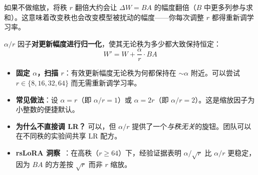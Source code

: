 \begin{intuitionbox}
如果不做缩放，将秩 $r$ 翻倍大约会让 $\Delta W = BA$ 的幅度翻倍（$B$ 中更多列参与求和）。这意味着改变秩也会改变模型被扰动的幅度——你每次调整 $r$ 都得重新调学习率。

$\alpha/r$ 因子\textbf{对更新幅度进行归一化}，使其无论秩为多少都大致保持恒定：
\[
W' = W + \frac{\alpha}{r} \cdot BA
\]

\begin{itemize}
  \item \textbf{固定 $\alpha$，扫描 $r$}：有效更新幅度无论秩为何都保持在 $\sim\alpha$ 附近。可以尝试 $r \in \{8, 16, 32, 64\}$ 而无需重新调学习率。
  \item \textbf{常见做法}：设 $\alpha = r$（即 $\alpha/r = 1$）或 $\alpha = 2r$（即 $\alpha/r = 2$）。这是缩放因子为小整数的便捷默认。
  \item \textbf{为什么不直接调 LR？} 可以，但 $\alpha/r$ 提供了一个\emph{与秩无关}的旋钮。团队可以在不同秩的实验间共享 LR 配方。
  \item \textbf{rsLoRA 洞察}~\cite{kalajdzievski2023rslora}：在高秩（$r \geq 64$）下，经验证据表明 $\alpha/\sqrt{r}$ 比 $\alpha/r$ 更稳定，因为 $BA$ 的方差按 $\sqrt{r}$ 而非 $r$ 缩放。
\end{itemize}
\end{intuitionbox}

